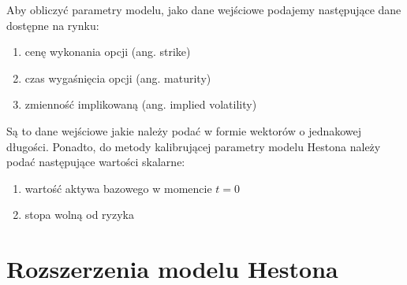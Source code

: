 \documentclass{pracamgr}
\begin{document}


Aby obliczyć parametry modelu, jako dane wejściowe podajemy następujące dane dostępne na rynku:
\begin{enumerate}
  \item cenę wykonania opcji (ang. strike)
  \item czas wygaśnięcia opcji (ang. maturity)
  \item zmienność implikowaną (ang. implied volatility)
\end{enumerate}
Są to dane wejściowe jakie należy podać w formie wektorów o jednakowej długości.
Ponadto, do metody kalibrującej parametry modelu Hestona należy podać następujące 
wartości skalarne:
\begin{enumerate}
  \item wartość aktywa bazowego w momencie $t=0$
  \item stopa wolną od ryzyka
\end{enumerate}

\chapter{Rozszerzenia modelu Hestona}



\end{document}
